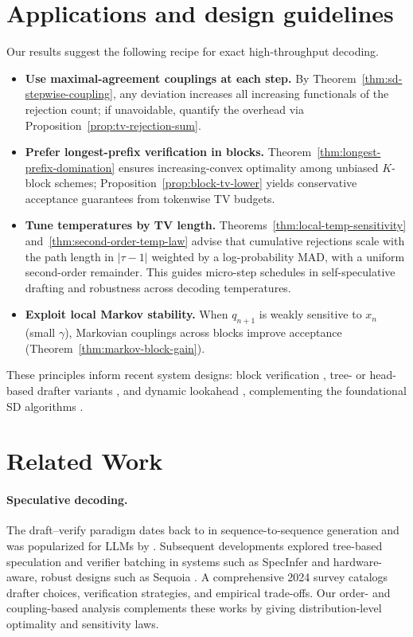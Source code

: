 \documentclass[11pt]{article}
\numberwithin{equation}{section}
\theoremstyle{plain}
\theoremstyle{definition}
\theoremstyle{remark}
\begin{document}
\section{Applications and design guidelines}
\label{sec:applications}
Our results suggest the following recipe for exact high-throughput decoding.
\begin{itemize}
  \item \textbf{Use maximal-agreement couplings at each step.} By Theorem~\ref{thm:sd-stepwise-coupling}, any deviation increases all increasing functionals of the rejection count; if unavoidable, quantify the overhead via Proposition~\ref{prop:tv-rejection-sum}.
  \item \textbf{Prefer longest-prefix verification in blocks.} Theorem~\ref{thm:longest-prefix-domination} ensures increasing-convex optimality among unbiased $K$-block schemes; Proposition~\ref{prop:block-tv-lower} yields conservative acceptance guarantees from tokenwise TV budgets.
  \item \textbf{Tune temperatures by TV length.} Theorems~\ref{thm:local-temp-sensitivity} and~\ref{thm:second-order-temp-law} advise that cumulative rejections scale with the path length in $|\tau-1|$ weighted by a log-probability MAD, with a uniform second-order remainder. This guides micro-step schedules in self-speculative drafting and robustness across decoding temperatures.
  \item \textbf{Exploit local Markov stability.} When $q_{n+1}$ is weakly sensitive to $x_n$ (small $\gamma$), Markovian couplings across blocks improve acceptance (Theorem~\ref{thm:markov-block-gain}).
\end{itemize}
These principles inform recent system designs: block verification \cite{Sun2024BlockVerification}, tree- or head-based drafter variants \cite{Miao2023SpecInfer,Ankner2024Hydra}, and dynamic lookahead \cite{Mamou2024DISCO}, complementing the foundational SD algorithms \cite{Leviathan2023SpeculativeDecoding,Xia2022SpeculativeDecoding}.

\section{Related Work}
\label{sec:related}
\paragraph{Speculative decoding.} The draft--verify paradigm dates back to \cite{Xia2022SpeculativeDecoding} in sequence-to-sequence generation and was popularized for LLMs by \cite{Leviathan2023SpeculativeDecoding}. Subsequent developments explored tree-based speculation and verifier batching in systems such as SpecInfer \cite{Miao2023SpecInfer} and hardware-aware, robust designs such as Sequoia \cite{Chen2024Sequoia}. A comprehensive 2024 survey \cite{Xia2024Survey} catalogs drafter choices, verification strategies, and empirical trade-offs. Our order- and coupling-based analysis complements these works by giving distribution-level optimality and sensitivity laws.
\end{document}
